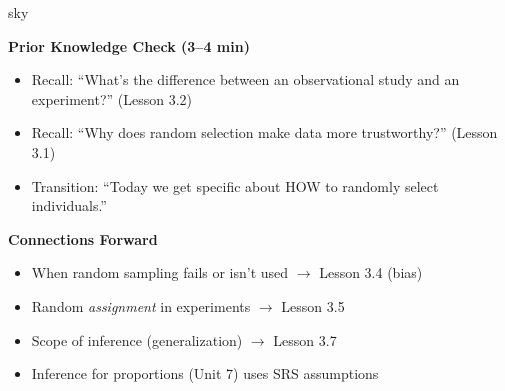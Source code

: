 \documentclass[10pt]{article}
\begin{document}
\begin{skillbox}{sky}
\begin{minipage}[t]{0.48\linewidth}
    \textbf{Prior Knowledge Check (3--4 min)}
    \begin{itemize}
        \item Recall: ``What's the difference between an observational study and an
              experiment?'' (Lesson 3.2)
        \item Recall: ``Why does random selection make data more trustworthy?''
              (Lesson 3.1)
        \item Transition: ``Today we get specific about HOW to randomly select
              individuals.''
    \end{itemize}
\end{minipage}
\hfill
\begin{minipage}[t]{0.48\linewidth}
    \textbf{Connections Forward}
    \begin{itemize}
        \item When random sampling fails or isn't used $\to$ Lesson 3.4 (bias)
        \item Random \emph{assignment} in experiments $\to$ Lesson 3.5
        \item Scope of inference (generalization) $\to$ Lesson 3.7
        \item Inference for proportions (Unit 7) uses SRS assumptions
    \end{itemize}
\end{minipage}
\end{skillbox}
\end{document}
